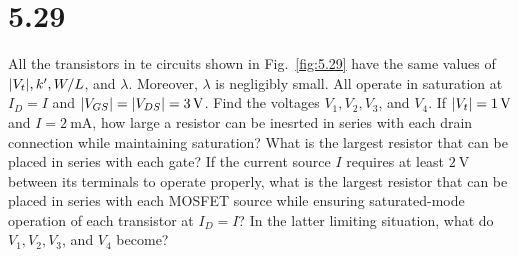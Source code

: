 \documentclass[12pt, a4paper]{article}
\begin{document}
\section{5.29}
All the transistors in te circuits shown in Fig.~\ref{fig:5.29} have the
same values of $\lvert V_t\rvert, k', W/L$, and $\lambda$. Moreover, $\lambda$ is
negligibly small. All operate in saturation at $I_D = I$ and $\abs{V_{GS}}
 = \abs{V_{DS}} = \SI{3}{\V}$. Find the voltages $V_1, V_2, V_3$, and $V_4$.
If $\abs{V_t} = \SI{1}{\V}$ and $I = \SI{2}{\mA}$, how large a resistor can
be inesrted in series with each drain connection while maintaining saturation?
What is the largest resistor that can be placed in series with each gate?
If the current source $I$ requires at least $\SI{2}{\V}$ between its terminals
to operate properly, what is the largest resistor that can be placed in series
with each MOSFET source while ensuring saturated-mode operation of each
transistor at $I_D = I$? In the latter limiting situation, what do $V_1, V_2,
V_3$, and $V_4$ become?
\end{document}
